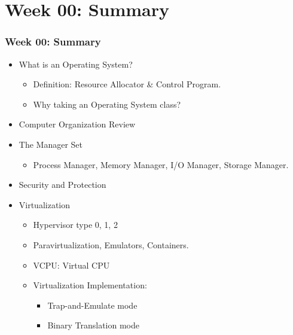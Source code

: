 \documentclass[aspectratio=169, xcolor=table, notheorems, hyperref={pdfpagelabels=false}]{beamer}
\begin{document}













\section{Week 00: Summary}
\begin{frame}
\frametitle{Week 00: Summary}
\begin{itemize}
\item What is an Operating System?
\begin{itemize}
\item Definition: Resource Allocator \& Control Program.
\item Why taking an Operating System class?
\end{itemize}
\item Computer Organization Review
\item The Manager Set
\begin{itemize}
\item Process Manager, Memory Manager, I/O Manager, Storage Manager.
\end{itemize}
\item Security and Protection
\item Virtualization
\begin{itemize}
\item Hypervisor type 0, 1, 2
\item Paravirtualization, Emulators, Containers.
\item VCPU: Virtual CPU
\item Virtualization Implementation:
\begin{itemize}
\item Trap-and-Emulate mode
\item Binary Translation mode
\end{itemize}
\end{itemize}
\end{itemize}
\end{frame}



\end{document}
